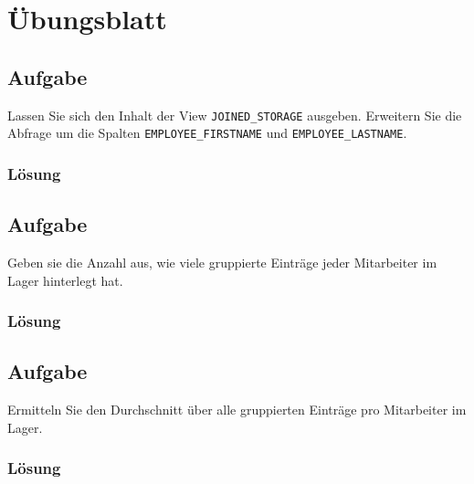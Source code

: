 \section{Übungsblatt}
\label{sec:uebung_04}

\subsection{Aufgabe}
\label{sec:uebung_04.aufgabe_01}
Lassen Sie sich den Inhalt der View \texttt{JOINED\_STORAGE} ausgeben. Erweitern Sie die Abfrage um die Spalten \texttt{EMPLOYEE\_FIRSTNAME} und \texttt{EMPLOYEE\_LASTNAME}.

\subsubsection*{Lösung}
\label{sec:uebung_04.aufgabe_01.loesung}

\subsection{Aufgabe}
\label{sec:uebung_04.aufgabe_02}
Geben sie die Anzahl aus, wie viele gruppierte Einträge jeder Mitarbeiter im Lager hinterlegt hat.

\subsubsection*{Lösung}
\label{sec:uebung_04.aufgabe_02.loesung}

\subsection{Aufgabe}
\label{sec:uebung_04.aufgabe_03}
Ermitteln Sie den Durchschnitt über alle gruppierten Einträge pro Mitarbeiter im Lager.

\subsubsection*{Lösung}
\label{sec:uebung_04.aufgabe_03.loesung}

